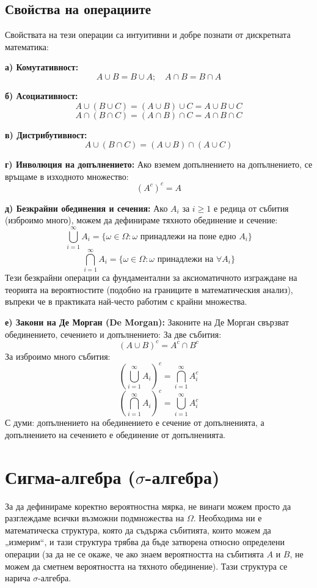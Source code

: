 \subsection{Свойства на операциите}

Свойствата на тези операции са интуитивни и добре познати от дискретната математика:

\textbf{а) Комутативност:}
\[
A \cup B = B \cup A; \quad A \cap B = B \cap A
\]

\textbf{б) Асоциативност:}
\[
A \cup (B \cup C) = (A \cup B) \cup C = A \cup B \cup C
\]
\[
A \cap (B \cap C) = (A \cap B) \cap C = A \cap B \cap C
\]

\textbf{в) Дистрибутивност:}
\[
A \cup (B \cap C) = (A \cup B) \cap (A \cup C)
\]

\textbf{г) Инволюция на допълнението:}
Ако вземем допълнението на допълнението, се връщаме в изходното множество:
\[
(A^c)^c = A
\]

\textbf{д) Безкрайни обединения и сечения:}
Ако $A_i$ за $i \ge 1$ е редица от събития (изброимо много), можем да дефинираме тяхното обединение и сечение:
\[
\bigcup_{i=1}^{\infty} A_i = \{ \omega \in \Omega : \omega \text{ принадлежи на поне едно } A_i \}
\]
\[
\bigcap_{i=1}^{\infty} A_i = \{ \omega \in \Omega : \omega \text{ принадлежи на } \forall A_i \}
\]
Тези безкрайни операции са фундаментални за аксиоматичното изграждане на теорията на вероятностите (подобно на границите в математическия анализ), въпреки че в практиката най-често работим с крайни множества.

\textbf{е) Закони на Де Морган (De Morgan):}
Законите на Де Морган свързват обединението, сечението и допълнението:
За две събития:
\[
(A \cup B)^c = A^c \cap B^c
\]
За изброимо много събития:
\[
\left(\bigcup_{i=1}^\infty A_i\right)^c = \bigcap_{i=1}^\infty A_i^c
\]
\[
\left(\bigcap_{i=1}^{\infty} A_i\right)^c = \bigcup_{i=1}^{\infty} A_i^c
\]
С думи: допълнението на обединението е сечение от допълненията, а допълнението на сечението е обединение от допълненията.

\section{Сигма-алгебра ($\sigma$-алгебра)}

За да дефинираме коректно вероятностна мярка, не винаги можем просто да разглеждаме всички възможни подмножества на $\Omega$. Необходима ни е математическа структура, която да съдържа събитията, които можем да „измерим“, и тази структура трябва да бъде затворена относно определени операции (за да не се окаже, че ако знаем вероятността на събитията $A$ и $B$, не можем да сметнем вероятността на тяхното обединение). Тази структура се нарича $\sigma$-алгебра.

